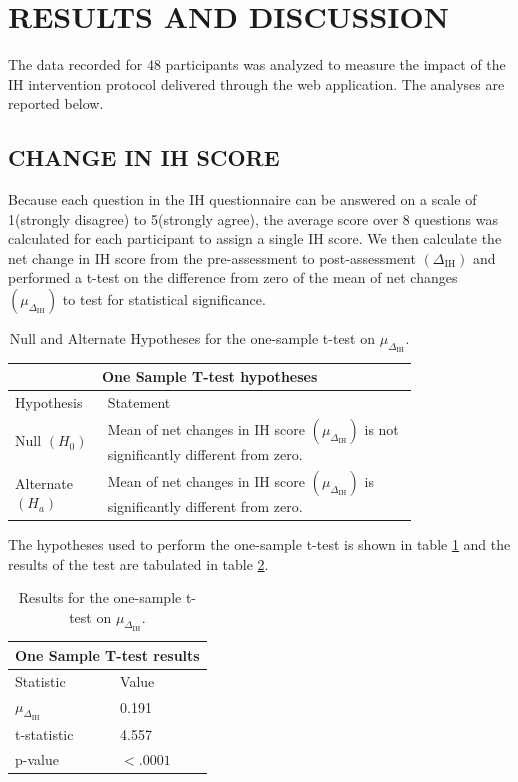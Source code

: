 \documentclass[journal]{IEEEtran}
\begin{document}
\section{RESULTS AND DISCUSSION}
The data recorded for 48 participants was analyzed to measure the impact of the IH intervention protocol delivered through the web application. The analyses are reported below.

\subsection{CHANGE IN IH SCORE}
Because each question in the IH questionnaire can be answered on a scale of 1(strongly disagree) to 5(strongly agree), the average score over 8 questions was calculated for each participant to assign a single IH score. We then calculate the net change in IH score from the pre-assessment to post-assessment $(\Delta_\text{IH})$ and performed a t-test on the difference from zero of the mean of net changes $(\mu_{\Delta_\text{IH}})$ to test for statistical significance.

\begin{table}[ht]
    \centering
    \begin{tabular}{p{0.15\linewidth}  p{0.65\linewidth}}
\hline
\multicolumn{2}{c}{\textbf{One Sample T-test hypotheses}} \\
\hline
Hypothesis    & Statement \\
\hline
Null $(H_0)$  & Mean of net changes in IH score $(\mu_{\Delta_\text{IH}})$ is not significantly different from zero.\\
Alternate $(H_a)$ & Mean of net changes in IH score $(\mu_{\Delta_\text{IH}})$ is significantly different from zero. \\
\hline
\end{tabular}
    \caption{Null and Alternate Hypotheses for the one-sample t-test on $\mu_{\Delta_\text{IH}}$.}
    \label{tab:hypotheses}
\end{table}

The hypotheses used to perform the one-sample t-test is shown in table \ref{tab:hypotheses} and the results of the test are tabulated in table \ref{tab:ttest-results}.

\begin{table}[ht]
    \centering
    \begin{tabular}{ll}
\hline
\multicolumn{2}{c}{\textbf{One Sample T-test results}} \\
\hline
Statistic    & Value \\
\hline
$\mu_{\Delta_\text{IH}}$  & 0.191 \\
t-statistic & 4.557 \\
p-value & $<.0001$ \\

\hline
\end{tabular}
    \caption{Results for the one-sample t-test on $\mu_{\Delta_\text{IH}}$.}
    \label{tab:ttest-results}
\end{table}
\end{document}
